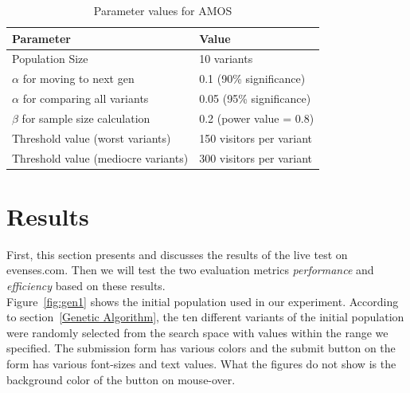 \documentclass{report}
\begin{document}
\begin{table}[h]
	\centering
	\begin{tabular}{|l|l|}
		\hline
		\textbf{Parameter}                    & \textbf{Value}           \\ \hline
		Population Size                       & 10 variants              \\ \hline
		\(\alpha\) for moving to next gen     & 0.1 (90\% significance)  \\ \hline
		\(\alpha\) for comparing all variants & 0.05 (95\% significance) \\ \hline
		\(\beta\) for sample size calculation & 0.2 (power value = 0.8)  \\ \hline
		Threshold value (worst variants)      & 150 visitors per variant \\ \hline
		Threshold value (mediocre variants)   & 300 visitors per variant \\ \hline
	\end{tabular}
	\caption {Parameter values for AMOS}
	
	\label{tab:par}
\end{table}

\section{Results}
First, this section presents and discusses the results of the live test on evenses.com. Then we will test the two evaluation metrics \textit{performance} and \textit{efficiency} based on these results.\\

Figure~\ref{fig:gen1} shows the initial population used in our experiment. According to section~\ref{Genetic Algorithm}, the ten different variants of the initial population were randomly selected from the search space with values within the range we specified. The submission form has various colors and the submit button on the form has various font-sizes and text values. What the figures do not show is the background color of the button on mouse-over.\\
\end{document}

